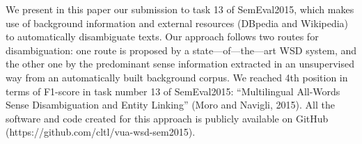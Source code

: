 We present in this paper our submission to task 13 of SemEval2015, which makes use of background information and external resources (DBpedia and Wikipedia) to automatically disambiguate texts. Our approach follows two routes for disambiguation: one route is proposed by a state---of---the---art WSD system, and the other one by the predominant sense information extracted in an unsupervised way from an automatically built background corpus. We reached 4th position in terms of F1-score in task number 13 of SemEval2015: ``Multilingual All-Words Sense Disambiguation and Entity Linking'' (Moro and Navigli, 2015). All the software and code created for this approach is publicly available on GitHub (https://github.com/cltl/vua-wsd-sem2015).

